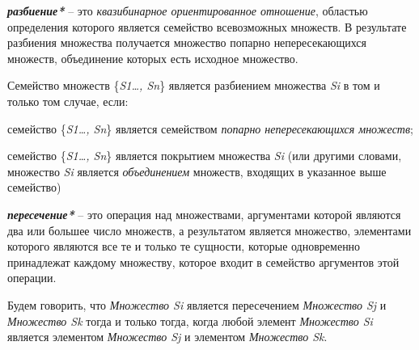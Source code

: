 \begin{SCn}
\end{SCn}
	
\textbf{\textit{разбиение*}} – это \textit{квазибинарное ориентированное отношение}, областью определения которого является семейство всевозможных множеств. В результате разбиения множества получается множество попарно непересекающихся множеств, объединение которых есть исходное множество.

Семейство множеств \{\textit{S1…, Sn}\} является разбиением множества \textit{Si} в том и только том случае, если:
\begin{textitemize}
		\item семейство \{\textit{S1…, Sn}\} является семейством \textit{попарно непересекающихся множеств};
		\item семейство \{\textit{S1…, Sn}\} является покрытием множества \textit{Si} (или другими словами, множество \textit{Si} является \textit{объединением} множеств, входящих в указанное выше семейство)
\end{textitemize}

\begin{SCn}
\end{SCn}

\textbf{\textit{пересечение*}} – это операция над множествами, аргументами которой являются два или большее число множеств, а результатом является множество, элементами которого являются все те и только те сущности, которые одновременно принадлежат каждому множеству, которое входит в семейство аргументов этой операции.

Будем говорить, что \textit{Множество Si} является пересечением \textit{Множество Sj} и \textit{Множество Sk} тогда и только тогда, когда любой элемент \textit{Множество Si} является элементом \textit{Множество Sj} и элементом \textit{Множество Sk}.

\begin{SCn}
\end{SCn}

